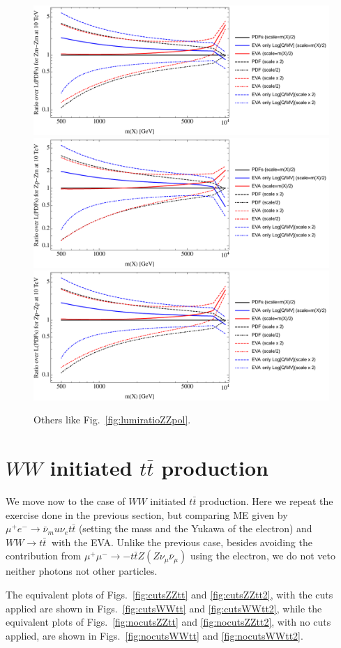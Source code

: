 \documentclass[a4paper,11pt]{article}
\begin{document}
\begin{figure}[!t]
\includegraphics[width=0.46\linewidth]{Notebooks/PlotLumi/10TeV/ratios/Zm-Zm.pdf}
\includegraphics[width=0.46\linewidth]{Notebooks/PlotLumi/10TeV/ratios/Zp-Zm.pdf}
\includegraphics[width=0.46\linewidth]{Notebooks/PlotLumi/10TeV/ratios/Zp-Zp.pdf}
\caption{Others like Fig.~\ref{fig:lumiratioZZpol}. \label{fig:lumiratioZZpol2}}
\end{figure}

\clearpage

\section{$WW$ initiated $t \bar t$ production}

We move now to the case of $WW$ initiated $t \bar t$ production. Here we repeat the exercise done in the previous section, but comparing ME given by $\mu^+e^-\to\bar \nu_mu \nu_e t \bar t$ (setting the mass and the Yukawa of the electron) and $WW\to t \bar t~$ with the EVA. Unlike the previous case, besides avoiding the contribution from $\mu^+\mu^-\to- t \bar t Z (Z \nu_\mu \bar \nu_\mu )$ using the electron, we do not veto neither photons not other particles.

The equivalent plots of Figs.~\ref{fig:cutsZZtt} and \ref{fig:cutsZZtt2}, with the cuts applied  are shown in Figs.~\ref{fig:cutsWWtt} and \ref{fig:cutsWWtt2}, while the  equivalent plots of Figs.~\ref{fig:nocutsZZtt} and \ref{fig:nocutsZZtt2}, with no cuts applied,  are shown in Figs.~\ref{fig:nocutsWWtt} and \ref{fig:nocutsWWtt2}. 
\end{document}
